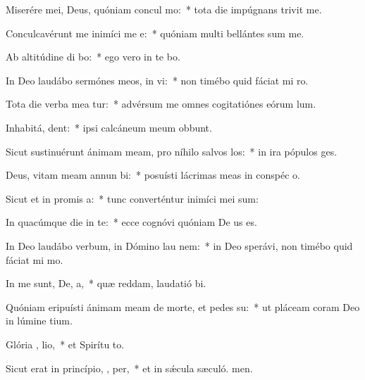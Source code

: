 \item Miserére mei, Deus, quóniam concul  mo:~* tota die impúgnans trivit me.
\item Conculcavérunt me inimíci me  e:~* quóniam multi bellántes sum me.
\item Ab altitúdine di bo:~* ego vero in te bo.
\item In Deo laudábo sermónes meos, in  vi:~* non timébo quid fáciat mi ro.
\item Tota die verba mea tur:~* advérsum me omnes cogitatiónes eórum  lum.
\item Inhabitá,  dent:~* ipsi calcáneum meum obbunt.
\item Sicut sustinuérunt ánimam meam, pro níhilo salvos  los:~* in ira pópulos ges.
\item Deus, vitam meam annun bi:~* posuísti lácrimas meas in conspéc o.
\item Sicut et in promis a:~* tunc converténtur inimíci mei sum:
\item In quacúmque die in te:~* ecce cognóvi quóniam De us es.
\item In Deo laudábo verbum, in Dómino lau nem:~* in Deo sperávi, non timébo quid fáciat mi mo.
\item In me sunt, De,  a,~* quæ reddam, laudatió bi.
\item Quóniam eripuísti ánimam meam de morte, et pedes   su:~* ut pláceam coram Deo in lúmine tium.
\item Glória ,  lio,~* et Spirítu to.
\item Sicut erat in princípio,  ,  per,~* et in sǽcula sæculó. men.
